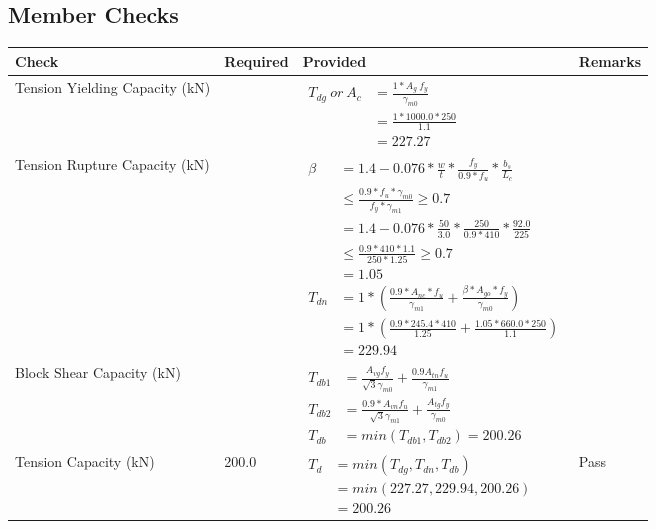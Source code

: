 \documentclass{article}%
\begin{document}
\subsection{Member Checks}%
\label{subsec:MemberChecks}%
\renewcommand{\arraystretch}{1.2}%
\begin{longtable}{|p{2.5cm}|p{4.5cm}|p{8cm}|p{1cm}|}%
\hline%
\rowcolor{OsdagGreen}%
Check&Required&Provided&Remarks\\%
\hline%
\endhead%
\hline%
Tension Yielding Capacity (kN)&&$\begin{aligned}T_{dg}~or~A_c&= \frac{1 * A_g ~ f_y}{\gamma_{m0}}\\ &= \frac{1*1000.0*250}{1.1}\\ &= 227.27\end{aligned}$&\\%
\hline%
Tension Rupture Capacity (kN)&&$\begin{aligned}\beta &= 1.4 - 0.076*\frac{w}{t}*\frac{f_{y}}{0.9*f_{u}}*\frac{b_s}{L_c}\\ &\leq\frac{0.9*f_{u}*\gamma_{m0}}{f_{y}*\gamma_{m1}} \geq 0.7 \\ &= 1.4 - 0.076*\frac{50}{3.0}*\frac{250}{0.9*410}*\frac{92.0}{225 }\\ &\leq\frac{0.9* 410*1.1}{250*1.25} \geq 0.7 \\ &= 1.05\\ T_{dn} &= 1*(\frac{0.9*A_{nc}*f_{u}}{\gamma_{m1}} + \frac{\beta * A_{go} * f_{y}}{\gamma_{m0}})\\ &= 1*(\frac{0.9* 245.4*410}{1.25} + \frac{1.05*660.0*250}{1.1})\\ &= 229.94\end{aligned}$&\\%
\hline%
Block Shear Capacity (kN)&&$\begin{aligned}T_{db1} &= \frac{A_{vg} f_{y}}{\sqrt{3} \gamma_{m0}} + \frac{0.9 A_{tn} f_{u}}{\gamma_{m1}}\\ T_{db2} &= \frac{0.9*A_{vn} f_{u}}{\sqrt{3} \gamma_{m1}} + \frac{A_{tg} f_{y}}{\gamma_{m0}}\\ T_{db} &= min(T_{db1}, T_{db2})= 200.26\end{aligned}$&\\%
\hline%
Tension Capacity (kN)&200.0&$\begin{aligned} T_d &= min(T_{dg},T_{dn},T_{db})\\ &= min(227.27,229.94,200.26)\\ &=200.26\end{aligned}$&Pass\\%
\hline%

\end{longtable}
\end{document}
